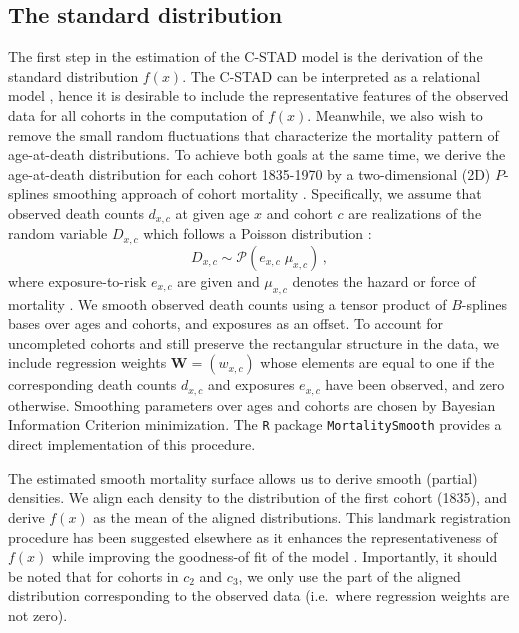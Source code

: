 \documentclass[11pt, a4paper]{article}
\begin{document}
\subsection{The standard distribution}
\label{Subsec:Standard}
The first step in the estimation of the C-STAD model is the derivation of the standard distribution $f(x)$. The C-STAD can be interpreted as a relational model \citep{brass1971scale}, hence it is desirable to include the representative features of the observed data for all cohorts in the computation of $f(x)$. Meanwhile, we also wish to remove the small random fluctuations that characterize the mortality pattern of age-at-death distributions. To achieve both goals at the same time, we derive the age-at-death distribution for each cohort 1835-1970 by a two-dimensional (2D) $P$-splines smoothing approach of cohort mortality \citep{eilers1996flexible, currie2004smoothing}. Specifically, we assume that observed death counts $d_{x,c}$ at given age $x$ and cohort $c$ are realizations of the random variable $D_{x,c}$ which follows a Poisson distribution \citep{brillinger1986biometrics}:
%
\begin{equation}\label{Eq:Poisson}
D_{x,c} \sim \mathcal{P}(e_{x,c} \; \mu_{x,c}) \, ,
\end{equation}
%
where exposure-to-risk $e_{x,c}$ are given and $\mu_{x,c}$ denotes the hazard or force of mortality \cite[such as in, for example,][]{brouhns2002poisson}. We smooth observed death counts using a tensor product of $B$-splines bases over ages and cohorts, and exposures as an offset. To account for uncompleted cohorts and still preserve the rectangular structure in the data, we include regression weights $\bm{W} = (w_{x,c})$ whose elements are equal to one if the corresponding death counts $d_{x,c}$ and exposures $e_{x,c}$ have been observed, and zero otherwise. Smoothing parameters over ages and cohorts are chosen by Bayesian Information Criterion minimization. The \texttt{R} package \texttt{MortalitySmooth} \citep{camarda2012mortalitysmooth} provides a direct implementation of this procedure. 

The estimated smooth mortality surface allows us to derive smooth (partial) densities. We align each density to the distribution of the first cohort (1835), and derive $f(x)$ as the mean of the aligned distributions. This landmark registration procedure has been suggested elsewhere as it enhances the representativeness of $f(x)$ while improving the goodness-of fit of the model \cite[for additional details, see][]{basellini2019modelling}. Importantly, it should be noted that for cohorts in $c_2$ and $c_3$, we only use the part of the aligned distribution corresponding 
to the observed data (i.e.~where regression weights are not zero). 
\end{document}
